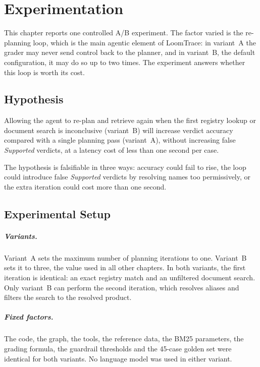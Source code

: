 \chapter{Experimentation}

This chapter reports one controlled A/B experiment. The factor varied is the re-planning loop, which
is the main agentic element of LoomTrace: in variant~A the grader may never send control back to the
planner, and in variant~B, the default configuration, it may do so up to two times. The experiment
answers whether this loop is worth its cost.

\section{Hypothesis}

Allowing the agent to re-plan and retrieve again when the first registry lookup or document search is
inconclusive (variant~B) will increase verdict accuracy compared with a single planning pass
(variant~A), without increasing false \emph{Supported} verdicts, at a latency cost of less than one
second per case.

The hypothesis is falsifiable in three ways: accuracy could fail to rise, the loop could introduce
false \emph{Supported} verdicts by resolving names too permissively, or the extra iteration could cost
more than one second.

\section{Experimental Setup}

\paragraph{Variants.} Variant~A sets the maximum number of planning iterations to one. Variant~B sets it
to three, the value used in all other chapters. In both variants, the first iteration is identical: an
exact registry match and an unfiltered document search. Only variant~B can perform the second
iteration, which resolves aliases and filters the search to the resolved product.

\paragraph{Fixed factors.} The code, the graph, the tools, the reference data, the BM25 parameters,
the grading formula, the guardrail thresholds and the 45-case golden set were identical for both
variants. No language model was used in either variant.

